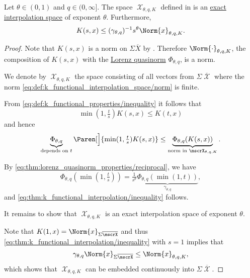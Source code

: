 \begin{theorem}\label{thm:k_functional_interpolation}
  Let \( \theta \in (0, 1) \) and \( q \in (0, \infty] \). The space \( \mscrX_{\theta,q,K} \) defined in  is an \hyperref[def:banach_interpolation_space_exponent]{exact interpolation space} of exponent \( \theta \). Furthermore,
  \begin{equation}\label{eq:thm:k_functional_interpolation/inequality}
    K(s, x) \leq (\gamma_{\theta,q})^{-1} s^\theta \Norm{x}_{\theta,q,K}.
  \end{equation}
\end{theorem}
\begin{proof}
  Note that \( K(s, x) \) is a norm on \( \Sigma \overline{X} \) by . Therefore \( \Norm{\cdot}_{\theta,q,K} \), the composition of \( K(s, x) \) with the \hyperref[def:lorenz_quasinorm]{Lorenz quasinorm} \( \Phi_{\theta,q} \), is a norm.

  We denote by \( \mscrX_{\theta,q,K} \) the space consisting of all vectors from \( \Sigma \overline{\mscrX} \) where the norm \eqref{eq:def:k_functional_interpolation_space/norm} is finite.

  From \eqref{eq:def:k_functional_properties/inequality} it follows that
  \begin{equation*}
    \min(1, \tfrac t s) K(s, x) \leq K(t, x)
  \end{equation*}
  and hence
  \begin{equation*}
    \underbrace{\Phi_{\theta,q}}_{\text{depends on } t} \Paren[\Big]{ \min(1, \tfrac t s) K(s, x) } \leq \underbrace{\Phi_{\theta,q}(K(s, x))}_{\text{norm in } \mscrX_{\theta,q,K}}.
  \end{equation*}

  By \eqref{eq:thm:lorenz_quasinorm_properties/reciprocal}, we have
  \begin{equation*}
    \Phi_{\theta,q}(\min(1, \tfrac t s)) = \tfrac 1 {s^\theta} \underbrace{\Phi_{\theta,q}(\min(1, t))}_{\hyperref[eq:def:lorenz_quasinorm/gamma]{\gamma_{\theta,q}}},
  \end{equation*}
  and \eqref{eq:thm:k_functional_interpolation/inequality} follows.

  It remains to show that \( \mscrX_{\theta,q,K} \) is an exact interpolation space of exponent \( \theta \).

  Note that \( K(1, x) = \Norm{x}_{\Sigma \overline{\mscrX}} \) and thus \eqref{eq:thm:k_functional_interpolation/inequality} with \( s = 1 \) implies that
  \begin{equation*}
    \gamma_{\theta,q} \Norm{x}_{\Sigma \overline{\mscrX}} \leq \Norm{x}_{\theta,q,K},
  \end{equation*}
  which shows that \( \mscrX_{\theta,q,K} \) can be embedded continuously into \( \Sigma \overline{\mscrX} \).


\end{proof}
